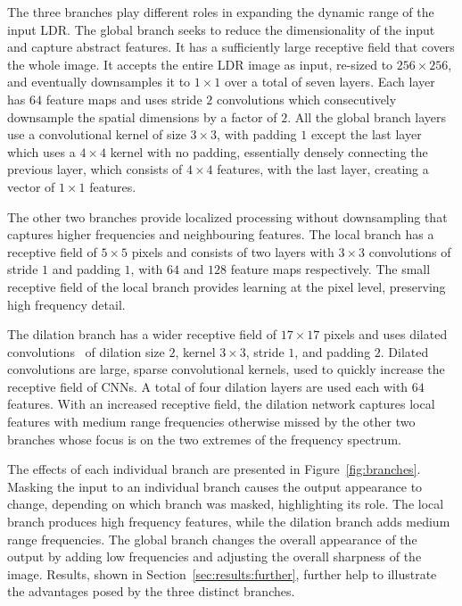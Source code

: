 \documentclass{egpubl}
\newcommand{\tc}[1]{{#1}}
\begin{document}
The three branches play different roles in expanding the dynamic range of the
input LDR. The global branch seeks to reduce the dimensionality of the input
and capture abstract features. It has a sufficiently large receptive field that
covers the whole image. It accepts the entire LDR image as input, re-sized to
$256\times256$, and eventually downsamples it to $1\times1$ over a total of
seven layers. Each layer has $64$ feature maps and uses stride $2$ convolutions
which consecutively downsample the spatial dimensions by a factor of $2$. All
the global branch layers use a convolutional kernel of size $3 \times 3$, with
padding $1$ except the last layer which uses a $4 \times 4$ kernel with no
padding, essentially densely connecting the previous layer, which consists of
$4\times4$ features, with the last layer, creating a vector of $1\times1$
features.

The other two branches provide localized processing without downsampling that
captures higher frequencies and neighbouring features. The local branch has a
receptive field of $5\times5$ pixels and consists of two layers with $3\times3$
convolutions of stride $1$ and padding $1$, with $64$ and $128$ feature maps
respectively. The small receptive field of the local branch provides learning
at the pixel level, preserving high frequency detail.

The dilation branch has a wider receptive field of $17\times17$ pixels and uses
dilated convolutions~\cite{yu2015dilated} of dilation size $2$, kernel
$3\times3$, stride $1$, and padding $2$. Dilated convolutions are large, sparse
convolutional kernels, used to quickly increase the receptive field of CNNs. A
total of four dilation layers are used each with $64$ features. With an
increased receptive field, the dilation network captures local features with
medium range frequencies otherwise missed by the other two branches whose focus
is on the two extremes of the frequency spectrum.

The effects of each individual branch are presented in
Figure~\ref{fig:branches}. Masking the input to an individual branch causes the
output appearance to change, depending on which branch was masked, highlighting
its role. The local branch produces high frequency features,
while the dilation branch adds medium range frequencies. The global branch
changes the overall appearance of the output by adding low frequencies and
adjusting the overall sharpness of the image. \tc{Results, shown in Section~\ref{sec:results:further}, further 
help to illustrate the advantages posed by the three distinct branches.}
\end{document}
